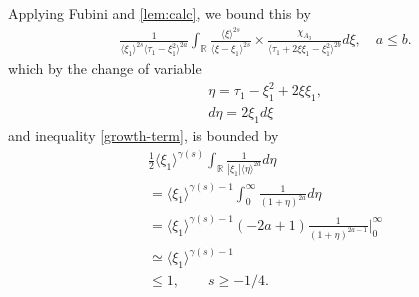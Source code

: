 \documentclass[12pt,reqno]{amsart}
\numberwithin{equation}{section}  %
\numberwithin{figure}{section}
\newcommand{\rr}{\mathbb{R}}
\theoremstyle{plain}
\theoremstyle{definition}
\theoremstyle{remark}
\begin{document}
Applying Fubini and \autoref{lem:calc}, we bound this by
%
%
\begin{equation*}
\begin{split}
  &  \frac{1}{\langle \xi_{1} \rangle ^{2s}
  \langle \tau_{1} - \xi_{1}^{2}  \rangle
  ^{2a}} \int_{\rr} \frac{\langle \xi \rangle ^{2s}}{\langle
  \xi - \xi_{1}\rangle ^{2s}}  \times \frac{\chi_{A_{3}}}{\langle
  \tau_{1} + 2 \xi \xi_{1} - \xi_{1}^{2} \rangle ^{2b}} d \xi, \quad a \le b.
\end{split}
\end{equation*}
%
%
which by the change of variable
%
%
\begin{equation*}
\begin{split}
  & \eta = \tau_{1} - \xi_{1}^{2} + 2 \xi \xi_{1},
  \\
  & d \eta = 2 \xi_{1} d \xi
\end{split}
\end{equation*}
%
%
and inequality \eqref{growth-term}, is bounded by
%
%
\begin{equation*}
\begin{split}
  & \frac{1}{2} \langle \xi_{1} \rangle ^{\gamma(s)}  \int_{\rr} 
  \frac{1}{| \xi_{1} |\langle \eta \rangle ^{2a} }d \eta
  \\
  & = \langle \xi_{1} \rangle ^{\gamma(s)-1} \int_{0}^{\infty} \frac{1}{(1 + \eta
  )^{2a}}d \eta
  \\
  & =  \langle \xi_{1}  \rangle ^{\gamma(s) -1} (-2a +1)\frac{1}{(1 + \eta
  )^{2a-1}} \Big |_{0}^{\infty}
  \\
  & \simeq \langle \xi_{1} \rangle ^{\gamma(s)-1}
  \\
  & \le 1, \qquad s \ge -1/4.
\end{split}
\end{equation*}
%
%
\end{document}

